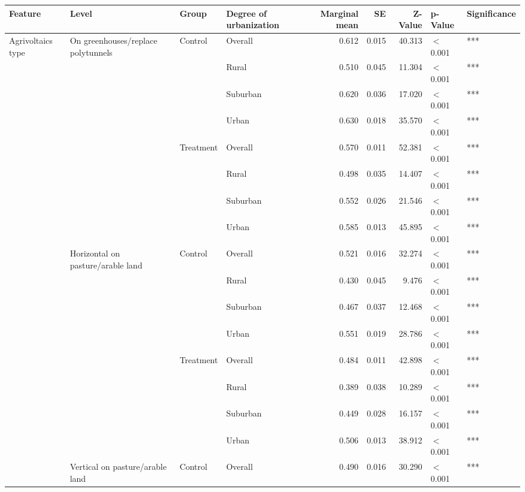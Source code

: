 
\begin{longtable}[t]{>{\raggedright\arraybackslash}t{4cm}>{\raggedright\arraybackslash}t{4cm}>{\raggedright\arraybackslash}t{2.5cm}lrrrll}
\toprule
Feature & Level & Group & Degree of urbanization & Marginal mean & SE & Z-Value & p-Value & Significance\\
\midrule
Agrivoltaics type & On greenhouses/replace polytunnels & Control & Overall & 0.612 & 0.015 & 40.313 & $<$0.001 & ***\\
\nopagebreak
 &  &  & Rural & 0.510 & 0.045 & 11.304 & $<$0.001 & ***\\
\nopagebreak
 &  &  & Suburban & 0.620 & 0.036 & 17.020 & $<$0.001 & ***\\
\nopagebreak
 &  &  & Urban & 0.630 & 0.018 & 35.570 & $<$0.001 & ***\\
\nopagebreak
 &  & Treatment & Overall & 0.570 & 0.011 & 52.381 & $<$0.001 & ***\\
\nopagebreak
 &  &  & Rural & 0.498 & 0.035 & 14.407 & $<$0.001 & ***\\
\nopagebreak
 &  &  & Suburban & 0.552 & 0.026 & 21.546 & $<$0.001 & ***\\
\nopagebreak
 &  &  & Urban & 0.585 & 0.013 & 45.895 & $<$0.001 & ***\\
\nopagebreak
 & Horizontal on pasture/arable land & Control & Overall & 0.521 & 0.016 & 32.274 & $<$0.001 & ***\\
\nopagebreak
 &  &  & Rural & 0.430 & 0.045 & 9.476 & $<$0.001 & ***\\
\nopagebreak
 &  &  & Suburban & 0.467 & 0.037 & 12.468 & $<$0.001 & ***\\
\nopagebreak
 &  &  & Urban & 0.551 & 0.019 & 28.786 & $<$0.001 & ***\\
\nopagebreak
 &  & Treatment & Overall & 0.484 & 0.011 & 42.898 & $<$0.001 & ***\\
\nopagebreak
 &  &  & Rural & 0.389 & 0.038 & 10.289 & $<$0.001 & ***\\
\nopagebreak
 &  &  & Suburban & 0.449 & 0.028 & 16.157 & $<$0.001 & ***\\
\nopagebreak
 &  &  & Urban & 0.506 & 0.013 & 38.912 & $<$0.001 & ***\\
\nopagebreak
 & Vertical on pasture/arable land & Control & Overall & 0.490 & 0.016 & 30.290 & $<$0.001 & ***\\

\end{longtable}
